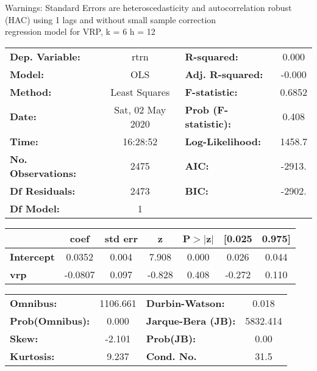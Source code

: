 Warnings: \newline
 [1] Standard Errors are heteroscedasticity and autocorrelation robust (HAC) using 1 lags and without small sample correction\\ 

regression model for VRP, k = 6 h = 12\begin{center}
\begin{tabular}{lclc}
\toprule
\textbf{Dep. Variable:}    &       rtrn       & \textbf{  R-squared:         } &     0.000   \\
\textbf{Model:}            &       OLS        & \textbf{  Adj. R-squared:    } &    -0.000   \\
\textbf{Method:}           &  Least Squares   & \textbf{  F-statistic:       } &    0.6852   \\
\textbf{Date:}             & Sat, 02 May 2020 & \textbf{  Prob (F-statistic):} &    0.408    \\
\textbf{Time:}             &     16:28:52     & \textbf{  Log-Likelihood:    } &    1458.7   \\
\textbf{No. Observations:} &        2475      & \textbf{  AIC:               } &    -2913.   \\
\textbf{Df Residuals:}     &        2473      & \textbf{  BIC:               } &    -2902.   \\
\textbf{Df Model:}         &           1      & \textbf{                     } &             \\
\bottomrule
\end{tabular}
\begin{tabular}{lcccccc}
                   & \textbf{coef} & \textbf{std err} & \textbf{z} & \textbf{P$> |$z$|$} & \textbf{[0.025} & \textbf{0.975]}  \\
\midrule
\textbf{Intercept} &       0.0352  &        0.004     &     7.908  &         0.000        &        0.026    &        0.044     \\
\textbf{vrp}       &      -0.0807  &        0.097     &    -0.828  &         0.408        &       -0.272    &        0.110     \\
\bottomrule
\end{tabular}
\begin{tabular}{lclc}
\textbf{Omnibus:}       & 1106.661 & \textbf{  Durbin-Watson:     } &    0.018  \\
\textbf{Prob(Omnibus):} &   0.000  & \textbf{  Jarque-Bera (JB):  } & 5832.414  \\
\textbf{Skew:}          &  -2.101  & \textbf{  Prob(JB):          } &     0.00  \\
\textbf{Kurtosis:}      &   9.237  & \textbf{  Cond. No.          } &     31.5  \\
\bottomrule
\end{tabular}
\end{center}

